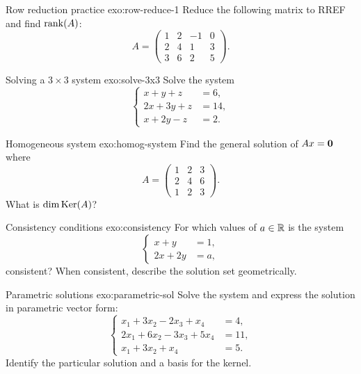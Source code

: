 \begin{exercise}{Row reduction practice \basic}{exo:row-reduce-1}
Reduce the following matrix to RREF and find $\operatorname{rank}(A)$:
\[
  A = \begin{pmatrix}
    1 & 2 & -1 & 0\\
    2 & 4 & 1 & 3\\
    3 & 6 & 2 & 5
  \end{pmatrix}.
\]
\end{exercise}

\begin{exercise}{Solving a $3\times 3$ system \basic}{exo:solve-3x3}
Solve the system
\[
  \left\{
  \begin{aligned}
    x + y + z &= 6,\\
    2x + 3y + z &= 14,\\
    x + 2y - z &= 2.
  \end{aligned}
  \right.
\]
\end{exercise}

\begin{exercise}{Homogeneous system \basic}{exo:homog-system}
Find the general solution of $Ax = \mathbf{0}$ where
\[
  A = \begin{pmatrix}
    1 & 2 & 3\\
    2 & 4 & 6\\
    1 & 2 & 3
  \end{pmatrix}.
\]
What is $\dim\operatorname{Ker}(A)$?
\end{exercise}

\begin{exercise}{Consistency conditions \basic}{exo:consistency}
For which values of $a\in{\mathbb{R}}$ is the system
\[
  \left\{
  \begin{aligned}
    x + y &= 1,\\
    2x + 2y &= a,
  \end{aligned}
  \right.
\]
consistent? When consistent, describe the solution set geometrically.
\end{exercise}

\begin{exercise}{Parametric solutions \intermediate}{exo:parametric-sol}
Solve the system and express the solution in parametric vector form:
\[
  \left\{
  \begin{aligned}
    x_1 + 3x_2 - 2x_3 + x_4 &= 4,\\
    2x_1 + 6x_2 - 3x_3 + 5x_4 &= 11,\\
    x_1 + 3x_2 + x_4 &= 5.
  \end{aligned}
  \right.
\]
Identify the particular solution and a basis for the kernel.
\end{exercise}

